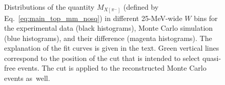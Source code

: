 \begin{figure}[!ht]
\begin{center}
\end{center}
\caption{\small Distributions of the quantity $M_{X[\pi^{-}]}$ (defined by Eq.~\eqref{eq:main_top_mm_nosq}) in different 25-MeV-wide $W$ bins for the experimental data (black histograms), Monte Carlo simulation (blue histograms), and their difference (magenta histograms). The explanation of the fit curves is given in the text. Green vertical lines correspond to the position of the cut that is intended to select quasi-free events. The cut is applied to the reconstructed Monte Carlo events as~well.}
\label{fig:main_top_mm_fsi_corr}
\end{figure}
\clearpage


